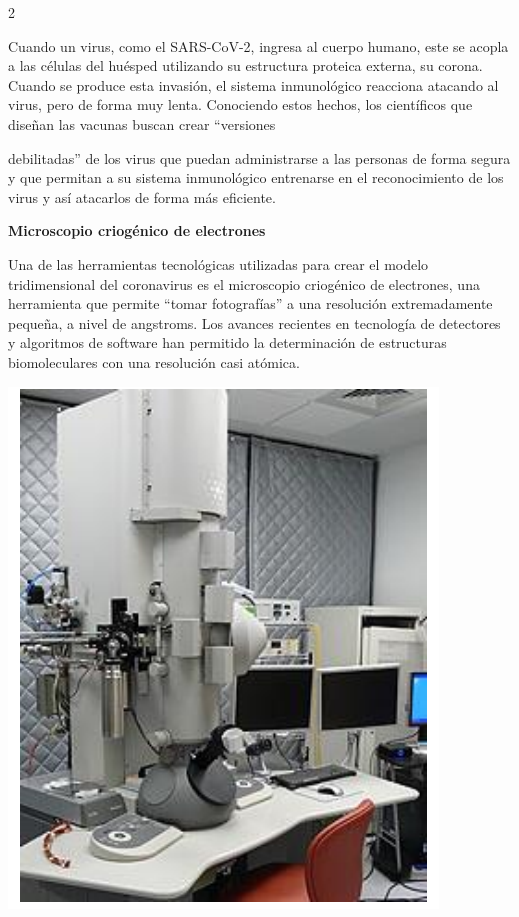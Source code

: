 \documentclass[12pt,spanish,Letterpaper,openany]{book}
\begin{document}
\begin {multicols}{2}
\begin {flushleft}
\begin{minipage}[c]{\columnwidth}
\end{minipage}

\end {flushleft}

Cuando un virus, como el SARS-CoV-2, ingresa al cuerpo humano, este se acopla a las células
del huésped utilizando su estructura proteica externa, su corona. Cuando se produce esta
invasión, el sistema inmunológico reacciona atacando al virus, pero de forma muy lenta.
Conociendo estos hechos, los científicos que diseñan las vacunas buscan crear ``versiones

debilitadas'' de los virus que puedan administrarse a las personas de forma segura y que
permitan a su sistema inmunológico entrenarse en el reconocimiento de los virus y así atacarlos
de forma más eficiente.

\textbf{Microscopio criogénico de electrones}

Una de las herramientas tecnológicas utilizadas para crear el modelo tridimensional del coronavirus es el
microscopio criogénico de electrones, una herramienta que permite ``tomar fotografías'' a una resolución
extremadamente pequeña, a nivel de angstroms. Los avances recientes en tecnología de detectores y
algoritmos de software han permitido la determinación de estructuras biomoleculares con una resolución casi
atómica.

\begin {flushleft}
\noindent\begin{minipage}[c]{\columnwidth}

\centering

\includegraphics[width=0.65\linewidth]{images/pareja51_02}


\end{minipage}
\end{flushleft}
\end{multicols}
\end{document}
